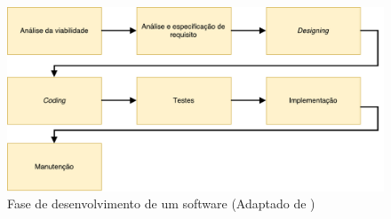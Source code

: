 \begin{figure}[!htb]
	\centering
	\includegraphics[scale=0.6]{esquemas/desenvolvimentoSW.pdf}
	\caption[Fase de desenvolvimento de um software ]{Fase de desenvolvimento de um software (Adaptado de \cite{Saini2014})}
	\label{sdlcartic}
\end{figure}




